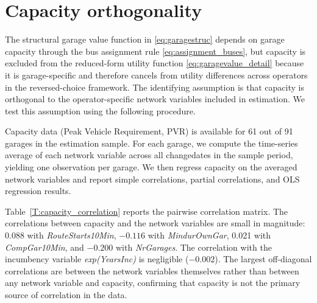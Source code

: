 \documentclass[12pt]{article}
\newcommand{\rootdir}{..}  %
\newcommand{\tables}{\rootdir/\rootdir/Output/tables}
\newcommand\fnote[1]{\captionsetup{font=small}\caption*{\emph{Notes}: #1}} %
\begin{document}
\begin{table}[!tb]
\caption{Drivers of private returns to capacity expansion}\label{tab:cap-expansion-reg}
\centering
\resizebox{0.9\textwidth}{!}{%
}
\fnote{OLS regressions with $\Delta \hat{\Pi}_{ij}$ \eqref{eq:UP1} as dependent variable, for all 62 garages in the sample with observed capacity that are not vacant and have buses stationed in 2019. Columns (1)--(3) use the nominal return to a 50-bus capacity expansion. Columns (4)--(6) deflate the dependent variable by the 2019 demeaned borough-level house price index, reducing the sample to the 55 garages located within the Greater London boundary for which borough-level house price data are available. Columns (7)--(9) adjust with more disaggregated ward-level house prices from HM Land Registry Price Paid Data from 2017, also demeaned across the observations in the sample.}
\end{table}


\clearpage
\section{Capacity orthogonality}\label{A:capacity}
\setcounter{table}{0}
\renewcommand{\thetable}{B\arabic{table}}
\setcounter{figure}{0}
\renewcommand{\thefigure}{B\arabic{figure}}
The structural garage value function in \eqref{eq:garagestruc} depends on 
garage capacity through the bus assignment rule \eqref{eq:assignment_buses}, 
but capacity is excluded from the reduced-form utility function 
\eqref{eq:garagevalue_detail} because it is garage-specific and therefore 
cancels from utility differences across operators in the reversed-choice 
framework. The identifying assumption is that capacity is orthogonal to the 
operator-specific network variables included in estimation. We test this 
assumption using the following procedure.

Capacity data (Peak Vehicle Requirement, PVR) is available for 61 out of 91 
garages in the estimation sample. For each garage, we compute the 
time-series average of each network variable across all changedates in the 
sample period, yielding one observation per garage. We then regress capacity 
on the averaged network variables and report simple correlations, partial 
correlations, and OLS regression results.

Table~\ref{T:capacity_correlation} reports the pairwise correlation matrix. 
The correlations between capacity and the network variables are small in 
magnitude: 0.088 with \textit{RouteStarts10Min}, $-0.116$ with 
\textit{MindurOwnGar}, 0.021 with \textit{CompGar10Min}, and $-0.200$ with 
\textit{NrGarages}. The correlation with the incumbency variable 
\textit{exp(YearsInc)} is negligible ($-0.002$). The largest off-diagonal 
correlations are between the network variables themselves rather than between 
any network variable and capacity, confirming that capacity is not the 
primary source of correlation in the data.
\end{document}
